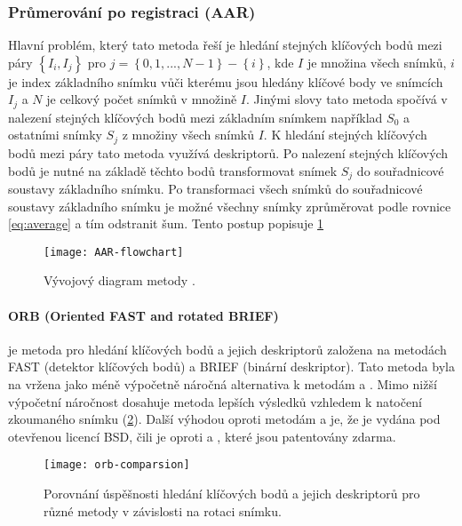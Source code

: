 \subsubsection{Průmerování po registraci (AAR)}
Hlavní problém, který tato metoda řeší je hledání stejných klíčových bodů mezi páry $\left\{ I_{i}, I_{j} \right\}$ pro $j = \left \{0, 1, ..., N - 1 \right \} - \left \{i \right \}$, kde $I$ je množina všech snímků, $i$ je index základního snímku vůči kterému jsou hledány klíčové body ve snímcích $I_{j}$ a $N$ je celkový počet snímků v množině $I$. Jinými slovy tato metoda spočívá v nalezení stejných klíčových bodů mezi základním snímkem například $S_{0}$ a ostatními snímky $S_{j}$ z množiny všech snímků $I$. K hledání stejných klíčových bodů mezi páry tato metoda využívá deskriptorů. Po nalezení stejných klíčových bodů je nutné na základě těchto bodů transformovat snímek $S_j$ do souřadnicové soustavy základního snímku. Po transformaci všech snímků do souřadnicové soustavy základního snímku je možné všechny snímky zprůměrovat podle rovnice \eqref{eq:average} a tím odstranit šum. Tento postup popisuje \cref{fig:AAR-flowchart}

\begin{figure}[htb]
\centering
\texttt{[image: AAR-flowchart]}
\caption{Vývojový diagram metody .}
\label{fig:AAR-flowchart}
\end{figure}

\paragraph{ORB (Oriented FAST and rotated BRIEF)}
je metoda pro hledání klíčových bodů a jejich deskriptorů založena na metodách FAST (detektor klíčových bodů) a BRIEF (binární deskriptor). Tato metoda byla na vržena jako méně výpočetně náročná alternativa k metodám  a . Mimo nižší výpočetní náročnost dosahuje metoda  lepších výsledků vzhledem k natočení zkoumaného snímku (\cref{fig:orb-comparsion}). Další výhodou  oproti metodám  a  je, že je vydána pod otevřenou licencí BSD, čili je oproti  a , které jsou patentovány zdarma. \cite{orb}
\begin{figure}[htb]
\centering
\texttt{[image: orb-comparsion]}
\caption{Porovnání úspěšnosti hledání klíčových bodů a jejich deskriptorů pro různé metody v závislosti na rotaci snímku. \cite{orb}}
\label{fig:orb-comparsion}
\end{figure}

